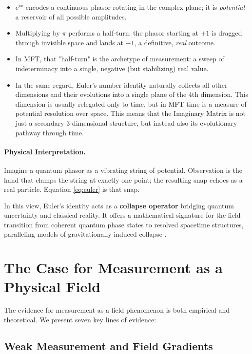 \begin{itemize}
  \item $e^{ix}$ encodes a continuous phasor rotating in the complex plane; it is \emph{potential}-a reservoir of all possible amplitudes.
  \item Multiplying by $\pi$ performs a half-turn: the phasor starting at $+1$ is dragged through invisible space and lands at $-1$, a definitive, \emph{real} outcome.
  \item In MFT, that "half-turn" is the archetype of measurement: a sweep of indeterminacy into a single, negative (but stabilizing) real value.
  \item In the same regard, Euler's number identity naturally collects all other dimensions and their evolutions into a single plane of the 4th dimension. This dimension is usually relegated only to time, but in MFT time is a measure of potential resolution over space. This means that the Imaginary Matrix is not just a secondary 3-dimensional structure, but instead also its evolutionary pathway through time.
\end{itemize}

\paragraph{Physical Interpretation.}
Imagine a quantum phasor as a vibrating string of potential. Observation is the hand that clamps the string at exactly one point; the resulting snap echoes as a real particle. Equation \eqref{eq:euler} is that snap.

In this view, Euler's identity acts as a \textbf{collapse operator} bridging quantum uncertainty and classical reality. It offers a mathematical signature for the field transition from coherent quantum phase states to resolved spacetime structures, paralleling models of gravitationally-induced collapse \cite{penrose_gravitys_1996}.

\section{The Case for Measurement as a Physical Field}

The evidence for measurement as a field phenomenon is both empirical and theoretical. We present seven key lines of evidence:

\subsection{Weak Measurement and Field Gradients}

